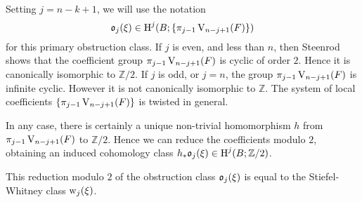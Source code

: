 \documentclass[../main]{subfiles}
\begin{document}
Setting $j=n-k+1$, we will use the notation
\[
\mathfrak{o}_{j}(\xi) \in \operatorname{H}^{j}(B ;\{\pi_{j-1}\operatorname{V}_{n-j+1}(F)\})
\]
for this primary obstruction class. If $j$ is even, and less than $n$, then Steenrod shows that the coefficient group $\pi_{j-1} \operatorname{V}_{n-j+1}(F)$ is cyclic of order $2$. Hence it is canonically isomorphic to $\mathbb{Z} / 2$. If $j$ is odd, or $j=n$, the group $\pi_{j-1}\operatorname{V}_{n-j+1}(F)$ is infinite cyclic. However it is not canonically isomorphic to $\mathbb{Z}$. The system of local coefficients $\{\pi_{j-1} \operatorname{V}_{n-j+1}(F)\}$ is twisted in general.

In any case, there is certainly a unique non-trivial homomorphism $h$ from $\pi_{j-1} \operatorname{V}_{n-j+1}(F)$ to $\mathbb{Z} / 2$. Hence we can reduce the coefficients modulo $2$, obtaining an induced cohomology class $h_{*} \mathfrak{o}_{j}(\xi) \in \operatorname{H}^{j}(B ; \mathbb{Z} / 2)$.

\begin{theorem}\label{thm:12.01}
This reduction modulo $2$ of the obstruction class $\mathfrak{o}_{j}(\xi)$ is equal to the Stiefel-Whitney class $\operatorname{w}_{j}(\xi)$.
\end{theorem} 
\end{document}
